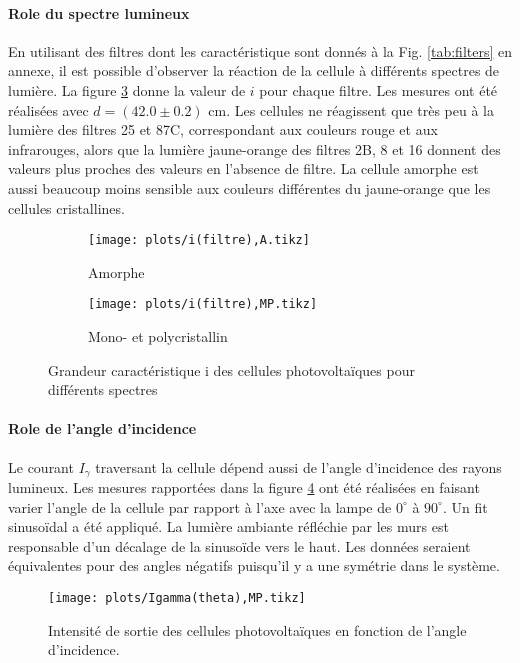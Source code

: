 \paragraph*{Role du spectre lumineux}
En utilisant des filtres dont les caractéristique sont donnés à la Fig. \ref{tab:filters} en annexe, il est possible d'observer la réaction de la cellule à différents spectres de lumière. La figure \ref{plot:6} donne la valeur de \(i\) pour chaque filtre. Les mesures ont été réalisées avec \(d = (42.0 \pm 0.2)\) \unit{\centi\meter}. Les cellules ne réagissent que très peu à la lumière des filtres 25 et 87C, correspondant aux couleurs rouge et aux infrarouges, alors que la lumière jaune-orange des filtres 2B, 8 et 16 donnent des valeurs plus proches des valeurs en l'absence de filtre. La cellule amorphe est aussi beaucoup moins sensible aux couleurs différentes du jaune-orange que les cellules cristallines.

\begin{figure}[h]
    \centering
    \begin{subfigure}[t]{0.45\linewidth}
        \centering
        \texttt{[image: plots/i(filtre),A.tikz]}
        \caption{Amorphe}
        \label{plot:6a}
    \end{subfigure}
    \begin{subfigure}[t]{0.45\linewidth}
        \centering
        \texttt{[image: plots/i(filtre),MP.tikz]}
        \caption{Mono- et polycristallin}
        \label{plot:6b}
    \end{subfigure}
    \caption{Grandeur caractéristique i des cellules photovoltaïques pour différents spectres}
    \label{plot:6}
\end{figure}

\paragraph*{Role de l'angle d'incidence}
Le courant \(I_\gamma\) traversant la cellule dépend aussi de l'angle d'incidence des rayons lumineux. Les mesures rapportées dans la figure \ref{plot:7} ont été réalisées en faisant varier l'angle de la cellule par rapport à l'axe avec la lampe de \(0^{\circ}\) à \(90^{\circ}\). Un fit sinusoïdal a été appliqué. La lumière ambiante réfléchie par les murs est responsable d'un décalage de la sinusoïde vers le haut. Les données seraient équivalentes pour des angles négatifs puisqu'il y a une symétrie dans le système.

\begin{figure}
    \centering
    \texttt{[image: plots/Igamma(theta),MP.tikz]}
    \caption{Intensité de sortie des cellules photovoltaïques en fonction de l'angle d'incidence.}
    \label{plot:7}
\end{figure}


